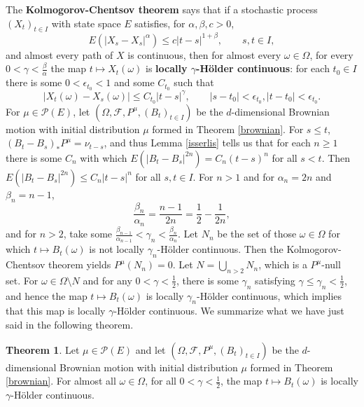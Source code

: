 \documentclass{article}
\theoremstyle{definition}
\newtheorem{theorem}{Theorem}
\theoremstyle{definition}
\begin{document}
The \textbf{Kolmogorov-Chentsov theorem} says that if a stochastic process $(X_t)_{t \in I}$ with state space
$E$ satisfies, for 
$\alpha,\beta,c>0$,
\[
E(|X_s-X_s|^\alpha) \leq c |t-s|^{1+\beta}, \qquad s,t \in I,
\]
and almost every path of $X$ is continuous, then for almost every $\omega \in \Omega$, for every
$0<\gamma<\frac{\beta}{\alpha}$ the map $t \mapsto X_t(\omega)$ is \textbf{locally
$\gamma$-H\"older continuous}: for each $t_0 \in I$ there is some $0<\epsilon_{t_0}<1$ and
some $C_{t_0}$ such that
\[
|X_t(\omega)-X_s(\omega)| \leq C_{t_0}|t-s|^\gamma, \qquad |s-t_0|<\epsilon_{t_0}, |t-t_0|<\epsilon_{t_0}.
\]
For $\mu \in \mathscr{P}(E)$,
let $(\Omega,\mathscr{F},P^\mu,(B_t)_{t \in I})$
be the $d$-dimensional Brownian motion with initial distribution $\mu$ formed in Theorem \ref{brownian}.
For $s \leq  t$, $(B_t-B_s)_*P^\mu = \nu_{t-s}$, and thus
Lemma \ref{isserlis}  tells us that for each $n \geq 1$ there is some $C_n$ with which
 $E(|B_t-B_s|^{2n}) = C_n (t-s)^n$ for all $s<t$. Then $E(|B_t-B_s|^{2n}) \leq C_n|t-s|^n$ for all $s,t \in I$.
 For $n >1$ and for $\alpha_n=2n$ and $\beta_n=n-1$, 
 \[
 \frac{\beta_n}{\alpha_n} = \frac{n-1}{2n} = \frac{1}{2} - \frac{1}{2n},
 \]
 and for $n>2$, take some $\frac{\beta_{n-1}}{\alpha_{n-1}}<\gamma_n<\frac{\beta_n}{\alpha_n}$.  
Let $N_n$ be the set of those $\omega \in \Omega$ for which
$t \mapsto B_t(\omega)$ is not locally $\gamma_n$-H\"older continuous. Then the Kolmogorov-Chentsov theorem yields
$P^\mu(N_n)=0$.
Let $N = \bigcup_{n>2} N_n$, which is a $P^\mu$-null set. For $\omega \in \Omega \setminus N$ and for any 
$0<\gamma<\frac{1}{2}$, 
there is some $\gamma_n$ satisfying $\gamma \leq \gamma_n<\frac{1}{2}$, and hence 
the map $t \mapsto B_t(\omega)$ is 
locally $\gamma_n$-H\"older continuous, which implies that this map is locally $\gamma$-H\"older continuous.
We summarize what we have just said in the following theorem. 

\begin{theorem}
Let $\mu \in \mathscr{P}(E)$ and let
$(\Omega,\mathscr{F},P^\mu,(B_t)_{t \in I})$ be the $d$-dimensional Brownian motion with initial distribution
$\mu$ 
formed in Theorem \ref{brownian}. For almost all $\omega \in \Omega$, for all $0<\gamma<\frac{1}{2}$, the map
$t \mapsto B_t(\omega)$  is locally $\gamma$-H\"older continuous.
\end{theorem}
\end{document}
